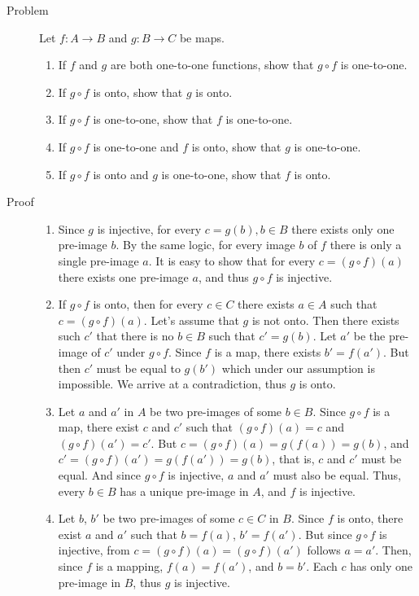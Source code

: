 \begin{description}
\item[Problem] Let $f : A \rightarrow B$ and $g : B \rightarrow C$ be maps.
\begin{enumerate}
\item If $f$ and $g$ are both one-to-one functions, show that $g \circ f$ is
one-to-one.
\item If $g \circ f$ is onto, show that $g$ is onto.
\item If $g \circ f$ is one-to-one, show that $f$ is one-to-one.
\item If $g \circ f$ is one-to-one and $f$ is onto, show that $g$ is
        one-to-one.
\item If $g \circ f$ is onto and $g$ is one-to-one, show that $f$ is onto.
\end{enumerate}
\item[Proof]
\begin{enumerate}
\item Since $g$ is injective, for every $c = g(b), b \in B$ there exists only
one pre-image $b$. By the same logic, for every image $b$ of $f$ there is only
a single pre-image $a$. It is easy to show that for every $c = (g \circ f)(a)$
there exists one pre-image $a$, and thus $g \circ f$ is injective.

\item If $g \circ f$ is onto, then for every $c \in C$ there exists $a \in A$
such that $c = (g \circ f)(a)$. Let's assume that $g$ is not onto. Then there
exists such $c'$ that there is no $b \in B$ such that $c' = g(b)$. Let $a'$ be
the pre-image of $c'$ under $g \circ f$. Since $f$ is a map, there exists
$b' = f(a')$. But then $c'$ must be equal to $g(b')$ which under our assumption
is impossible. We arrive at a contradiction, thus $g$ is onto.

\item Let $a$ and $a'$ in $A$ be two pre-images of some $b \in B$. Since $g
\circ f$ is a map, there exist $c$ and $c'$ such that $(g \circ f)(a) = c$ and
$(g \circ f)(a') = c'$. But $c = (g \circ f)(a) = g(f(a)) = g(b)$, and $c' = (g
\circ f)(a') = g(f(a')) = g(b)$, that is, $c$ and $c'$ must be equal.  And
since $g \circ f$ is injective, $a$ and $a'$ must also be equal. Thus, every $b
\in B$ has a unique pre-image in $A$, and $f$ is injective.  

\item Let $b$, $b'$ be two pre-images of some $c \in C$ in $B$. Since $f$ is
onto, there exist $a$ and $a'$ such that $b = f(a)$, $b' = f(a')$. But since $g
\circ f$ is injective, from $c = (g \circ f)(a) = (g \circ f)(a')$ follows $a =
a'$. Then, since $f$ is a mapping, $f(a) = f(a')$, and $b = b'$. Each $c$ has
only one pre-image in $B$, thus $g$ is injective.


\end{enumerate}
\end{description}
